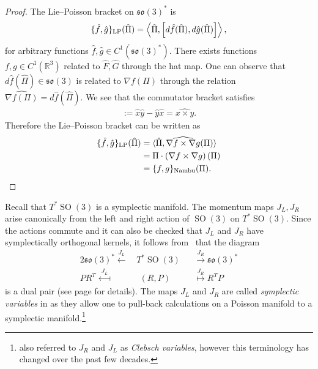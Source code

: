 \documentclass[12pt]{amsart}
\newcommand{\so}{\ensuremath{\mathfrak{so}}}
\DeclareMathOperator{\SO}{SO}
\begin{document}
  \begin{proof}
    The Lie--Poisson bracket on $\so(3)^*$ is
    \begin{align*}
      \{ \hat{f} , \hat{g} \}_{\rm LP} (\hat{\Pi}) =
      \left \langle \hat{\Pi} , \left[ d\hat{f}(\hat{\Pi}) , d\hat{g}(\hat{\Pi}) \right]
        \right \rangle,
    \end{align*}
    for arbitrary functions $\hat{f},\hat{g} \in C^1(\so(3)^*)$.
    There exists functions $f,g \in C^1(\mathbb{R}^3)$ related to $\hat{F},\hat{G}$ through the hat map.
    One can observe that $d\hat{f}(\hat{\Pi}) \in \so(3)$ is 
    related to $\nabla f(\Pi)$ through the relation $\widehat{ \nabla f(\Pi)} = d\hat{f}( \hat{\Pi})$.
    We see that the commutator bracket satisfies
    \begin{align*}
      [\hat{x},\hat{y} ] := \hat{x} \hat{y} - \hat{y} \hat{x} = \widehat{x \times y }.
    \end{align*}
    Therefore the Lie--Poisson bracket can be written as
    \begin{align*}
    \{ \hat{f} , \hat{g} \}_{\rm LP}(\hat{\Pi})
    &= \langle \hat{\Pi} , \widehat{ \nabla f \times \nabla g }(\Pi) \rangle \\
    &= \Pi \cdot  \left( \nabla f \times \nabla g \right)(\Pi) \\
    &= \{ f , g \}_{\rm Nambu}(\Pi).
    \end{align*}
  \end{proof}

  Recall that $T^*\SO(3)$ is a symplectic manifold. The momentum maps
  $J_L,J_R$ arise canonically from the left and right action of
  $\SO(3)$ on $T^* \SO(3)$. Since the actions commute and it can also
  be checked that $J_L$ and $J_R$ have symplectically orthogonal
  kernels, it follows from~\cite[Corollary~2.6]{GayBalmazVizman2012}
  that the diagram
  \begin{alignat*}{2}
    \so(3)^* \stackrel{J_L}{\longleftarrow}&
    \,T^* \SO(3)
    &&\stackrel{J_R}{\longrightarrow} \so(3)^* \\
     PR^T \stackrel{J_L}{\longmapsfrom}&
    \;\; (R,P)
    &&\stackrel{J_R}{\longmapsto} R^TP
  \end{alignat*}
  is a dual pair
  (see page \pageref{thm:dual_pairs} for details).
  The maps $J_L$ and $J_R$ are called \emph{symplectic variables} in \cite{MarsdenWeinstein1983}
  as they allow one to pull-back calculations on a Poisson manifold to a symplectic manifold.\footnote{
  	\cite{MarsdenWeinstein1983} also referred to $J_R$ and $J_L$ as \emph{Clebsch variables},
		however this terminology has changed over the past few decades.}
\end{document}
